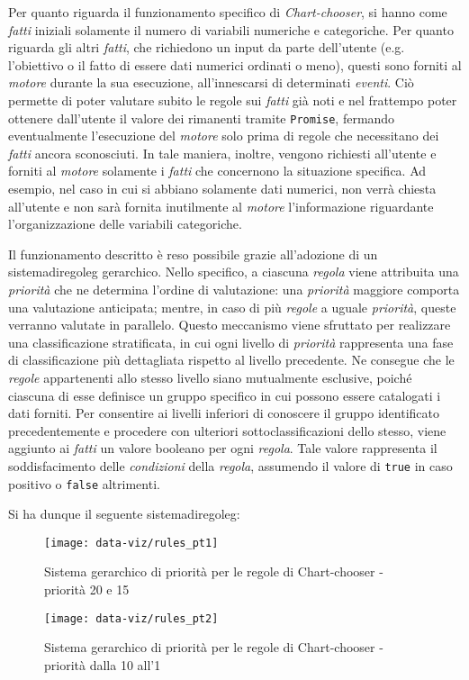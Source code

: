 \noindent Per quanto riguarda il funzionamento specifico di \emph{Chart-chooser}, si hanno come \emph{fatti} iniziali solamente il numero di variabili numeriche e categoriche. 
Per quanto riguarda gli altri \emph{fatti}, che richiedono un input da parte dell'utente (e.g. l'obiettivo o il fatto di essere dati numerici ordinati o meno), questi sono 
forniti al \emph{motore} durante la sua esecuzione, all'innescarsi di determinati \emph{eventi}. 
Ciò permette di poter valutare subito le regole sui \emph{fatti} già noti e nel frattempo poter ottenere dall'utente il valore dei rimanenti tramite \texttt{Promise}, fermando eventualmente l'esecuzione del \emph{motore} solo
prima di regole che necessitano dei \emph{fatti} ancora sconosciuti.
In tale maniera, inoltre, vengono richiesti all'utente e forniti al \emph{motore} solamente i \emph{fatti} che concernono la situazione specifica. Ad esempio, nel caso in cui si abbiano solamente dati numerici, 
non verrà chiesta all'utente e non sarà fornita inutilmente al \emph{motore} l'informazione riguardante l'organizzazione delle variabili categoriche.

Il funzionamento descritto è reso possibile grazie all'adozione di un \gls{sistemadiregoleg} gerarchico. Nello specifico, a ciascuna \emph{regola} viene attribuita una \emph{priorità} che ne determina l'ordine di valutazione:
una \emph{priorità} maggiore comporta una valutazione anticipata; mentre, in caso di più \emph{regole} a uguale \emph{priorità}, queste verranno valutate in parallelo.
Questo meccanismo viene sfruttato per realizzare una classificazione stratificata, in cui ogni livello di \emph{priorità} rappresenta una fase di classificazione più dettagliata rispetto al livello precedente. 
Ne consegue che le \emph{regole} appartenenti allo stesso livello siano mutualmente esclusive, poiché ciascuna di esse definisce un gruppo specifico in cui possono essere catalogati i dati forniti.
Per consentire ai livelli inferiori di conoscere il gruppo identificato precedentemente e procedere con ulteriori sottoclassificazioni dello stesso, viene aggiunto ai \emph{fatti} un valore booleano per ogni \emph{regola}. 
Tale valore rappresenta il soddisfacimento delle \emph{condizioni} della \emph{regola}, assumendo il valore di \texttt{true} in caso positivo o \texttt{false} altrimenti.

\bigskip
\noindent Si ha dunque il seguente \gls{sistemadiregoleg}:

\begin{figure}[H] 
    \centering 
    \texttt{[image: data-viz/rules\_pt1]} 
    \caption{Sistema gerarchico di priorità per le regole di Chart-chooser - priorità 20 e 15}
    \label{fig:rules_pt1}
\end{figure}
\begin{figure}[H] 
    \centering 
    \texttt{[image: data-viz/rules\_pt2]} 
    \caption{Sistema gerarchico di priorità per le regole di Chart-chooser - priorità dalla 10 all'1}
    \label{fig:rules_pt2}
\end{figure}

